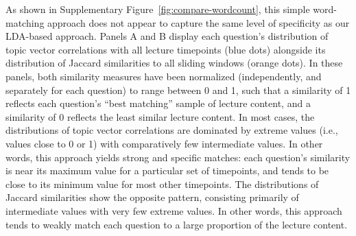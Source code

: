\documentclass[10pt]{article}
\begin{document}
As shown in Supplementary Figure~\ref{fig:compare-wordcount}, this simple 
word-matching approach does not appear to capture the same level of specificity 
as our LDA-based approach. Panels A and B display each question's distribution 
of topic vector correlations with all lecture timepoints (blue dots) alongside 
its distribution of Jaccard similarities to all sliding windows (orange dots). 
In these panels, both similarity measures have been normalized (independently, 
and separately for each question) to range between 0 and 1, such that a 
similarity of 1 reflects each question's ``best matching'' sample of lecture 
content, and a similarity of 0 reflects the least similar lecture content. In 
most cases, the distributions of topic vector correlations are dominated by 
extreme values (i.e., values close to 0 or 1) with comparatively few 
intermediate values. In other words, this approach yields strong and specific 
matches: each question's similarity is near its maximum value for a particular 
set of timepoints, and tends to be close to its minimum value for most other 
timepoints. The distributions of Jaccard similarities show the opposite pattern, 
consisting primarily of intermediate values with very few extreme values. In 
other words, this approach tends to weakly match each question to a large 
proportion of the lecture content. 
\end{document}

